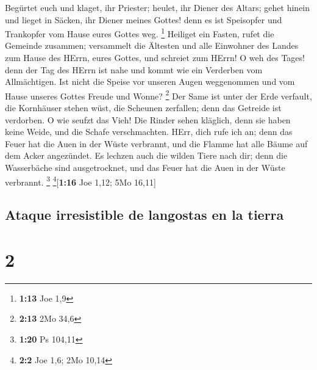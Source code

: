  Begürtet euch und klaget, ihr Priester; heulet, ihr
Diener des Altars; gehet hinein und lieget in Säcken, ihr Diener meines
Gottes! denn es ist Speisopfer und Trankopfer vom Hause eures Gottes
weg. \footnote{\textbf{1:13} Joe 1,9}  Heiliget ein
Fasten, rufet die Gemeinde zusammen; versammelt die Ältesten und alle
Einwohner des Landes zum Hause des HErrn, eures Gottes, und schreiet zum
HErrn!  O weh des Tages! denn der Tag des HErrn ist nahe
und kommt wie ein Verderben vom Allmächtigen.  Ist nicht
die Speise vor unseren Augen weggenommen und vom Hause unseres Gottes
Freude und Wonne? \footnote{\textbf{2:13} 2Mo 34,6}  Der
Same ist unter der Erde verfault, die Kornhäuser stehen wüst, die
Scheunen zerfallen; denn das Getreide ist verdorben.  O
wie seufzt das Vieh! Die Rinder sehen kläglich, denn sie haben keine
Weide, und die Schafe verschmachten.  HErr, dich rufe ich
an; denn das Feuer hat die Auen in der Wüste verbrannt, und die Flamme
hat alle Bäume auf dem Acker angezündet.  Es lechzen auch
die wilden Tiere nach dir; denn die Wasserbäche sind ausgetrocknet, und
das Feuer hat die Auen in der Wüste verbrannt. \footnote{\textbf{1:20}
  Ps 104,11} \footnote{\textbf{2:2} Joe 1,6; 2Mo 10,14}{[}\textbf{1:16}
Joe 1,12; 5Mo 16,11{]}

\hypertarget{ataque-irresistible-de-langostas-en-la-tierra}{%
\subsection{Ataque irresistible de langostas en la
tierra}\label{ataque-irresistible-de-langostas-en-la-tierra}}

\hypertarget{section-1}{%
\section{2}\label{section-1}}

